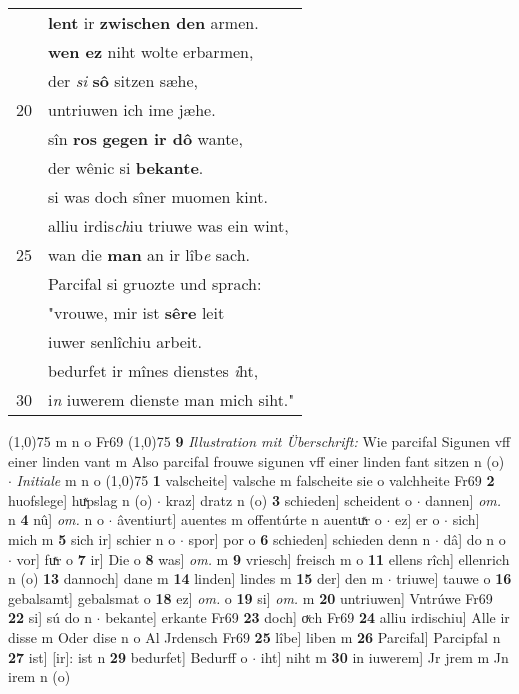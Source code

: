 \documentclass[8pt,a4paper,notitlepage]{article}
\begin{document}
\begin{table}[ht]
\begin{minipage}[t]{0.5\linewidth}
\begin{tabular}{rl}
 & \textbf{lent} ir \textbf{zwischen den} armen.\\ 
 & \textbf{wen ez} niht wolte erbarmen,\\ 
 & der \textit{si} \textbf{sô} sitzen sæhe,\\ 
20 & untriuwen ich ime jæhe.\\ 
 & sîn \textbf{ros} \textbf{gegen ir dô} wante,\\ 
 & der wênic si \textbf{bekante}.\\ 
 & si was doch sîner muomen kint.\\ 
 & alliu irdis\textit{ch}iu triuwe was ein wint,\\ 
25 & wan die \textbf{man} an ir lîb\textit{e} sach.\\ 
 & Parcifal si gruozte und sprach:\\ 
 & "vrouwe, mir ist \textbf{sêre} leit\\ 
 & iuwer senlîchiu arbeit.\\ 
 & bedurfet ir mînes dienstes \textit{i}ht,\\ 
30 & i\textit{n} iuwerem dienste man mich siht."\\ 
\end{tabular}
\scriptsize
\line(1,0){75} \newline
m n o Fr69 \newline
\line(1,0){75} \newline
\textbf{9} \textit{Illustration mit Überschrift:} Wie parcifal Sigunen vff einer linden vant m  Also parcifal frouwe sigunen vff einer linden fant sitzen n (o)   $\cdot$ \textit{Initiale} m n o  \newline
\line(1,0){75} \newline
\textbf{1} valscheite] valsche m falscheite sie o valchheite Fr69 \textbf{2} huofslege] huͯpslag n (o)  $\cdot$ kraz] dratz n (o) \textbf{3} schieden] scheident o  $\cdot$ dannen] \textit{om.} n \textbf{4} nû] \textit{om.} n o  $\cdot$ âventiurt] auentes m offentúrte n auentuͯr o  $\cdot$ ez] er o  $\cdot$ sich] mich m \textbf{5} sich ir] schier n o  $\cdot$ spor] por o \textbf{6} schieden] schieden denn n  $\cdot$ dâ] do n o  $\cdot$ vor] fuͯr o \textbf{7} ir] Die o \textbf{8} was] \textit{om.} m \textbf{9} vriesch] freisch m o \textbf{11} ellens rîch] ellenrich n (o) \textbf{13} dannoch] dane m \textbf{14} linden] lindes m \textbf{15} der] den m  $\cdot$ triuwe] tauwe o \textbf{16} gebalsamt] gebalsmat o \textbf{18} ez] \textit{om.} o \textbf{19} si] \textit{om.} m \textbf{20} untriuwen] Vntrúwe Fr69 \textbf{22} si] sú do n  $\cdot$ bekante] erkante Fr69 \textbf{23} doch] oͮch Fr69 \textbf{24} alliu irdischiu] Alle ir disse m Oder dise n o Al Jrdensch Fr69 \textbf{25} lîbe] liben m \textbf{26} Parcifal] Parcipfal n \textbf{27} ist] [ir]: ist n \textbf{29} bedurfet] Bedurff o  $\cdot$ iht] niht m \textbf{30} in iuwerem] Jr jrem m Jn irem n (o) \newline
\end{minipage}
\end{table}
\end{document}
